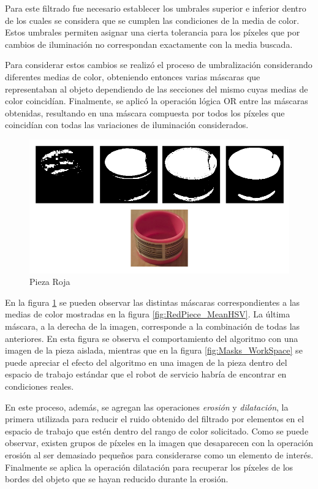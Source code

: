 Para este filtrado fue necesario establecer los umbrales superior e inferior dentro de los cuales se considera que se cumplen las condiciones de la media de color. Estos umbrales permiten asignar una cierta tolerancia para los píxeles que por cambios de iluminación no correspondan exactamente con la media buscada.

Para considerar estos cambios se realizó el proceso de umbralización considerando diferentes medias de color, obteniendo entonces varias máscaras que representaban al objeto dependiendo de las secciones del mismo cuyas medias de color coincidían. Finalmente, se aplicó la operación lógica OR entre las máscaras obtenidas, resultando en una máscara compuesta por todos los píxeles que coincidían con todas las variaciones de iluminación considerados.

\begin{figure}[ht]
\centering
\includegraphics[scale= 0.35]{Figures/Masks_Piece.png}
    \caption{Pieza Roja}
    \label{fig:Masks_RedPiece}
\end{figure}

En la figura \ref{fig:Masks_RedPiece} se pueden observar las distintas máscaras correspondientes a las medias de color mostradas en la figura \ref{fig:RedPiece_MeanHSV}. La última máscara, a la derecha de la imagen, corresponde a la combinación de todas las anteriores. En esta figura se observa el comportamiento del algoritmo con una imagen de la pieza aislada, mientras que en la figura \ref{fig:Masks_WorkSpace} se puede apreciar el efecto del algoritmo en una imagen de la pieza dentro del espacio de trabajo estándar que el robot de servicio habría de encontrar en condiciones reales. 

En este proceso, además, se agregan las operaciones \textit{erosión} y \textit{dilatación}, la primera utilizada para reducir el ruido obtenido del filtrado por elementos en el espacio de trabajo que estén dentro del rango de color solicitado. Como se puede observar, existen grupos de píxeles en la imagen que desaparecen con la operación erosión al ser demasiado pequeños para considerarse como un elemento de interés. Finalmente se aplica la operación dilatación para recuperar los píxeles  de los bordes del objeto que se hayan reducido durante la erosión. 


